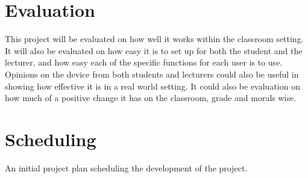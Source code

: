 \documentclass{article}
\begin{document}
\section{Evaluation}
This project will be evaluated on how well it works within the classroom setting. It will also be evaluated on how easy it is to set up for both the student and the lecturer, and how easy each of the specific functions for each user is to use. Opinions on the device from both students and lecturers could also be useful in showing how effective it is in a real world setting. It could also be evaluation on how much of a positive change it has on the classroom, grade and morals wise.

\pagebreak
\section{Scheduling}
An initial project plan scheduling the development of the project.
\end{document}
